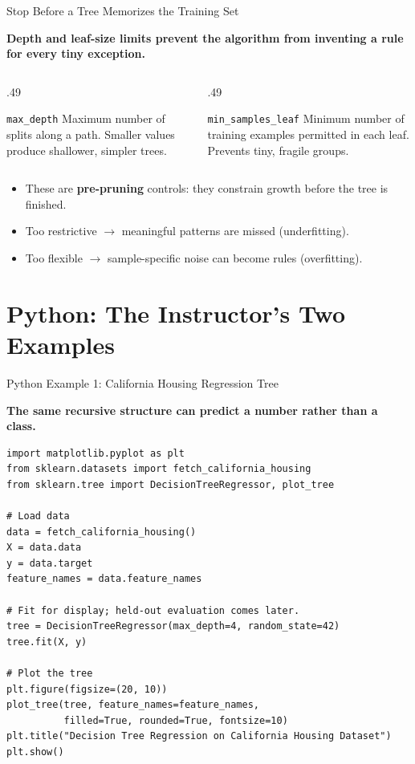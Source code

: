 \documentclass[aspectratio=169,10pt]{beamer}
\newcommand{\conceptlead}[1]{%
  {\normalsize\bfseries\color{CalPolyGreen}#1\par}%
}
\begin{document}
\begin{frame}{Stop Before a Tree Memorizes the Training Set}
\small
\conceptlead{Depth and leaf-size limits prevent the algorithm from inventing a rule for every tiny exception.}
\begin{columns}[T,onlytextwidth]
 \begin{column}{.49\textwidth}
  \begin{block}{\texttt{max\_depth}}
  Maximum number of splits along a path. Smaller values produce shallower, simpler trees.
  \end{block}
 \end{column}
 \begin{column}{.49\textwidth}
  \begin{block}{\texttt{min\_samples\_leaf}}
  Minimum number of training examples permitted in each leaf. Prevents tiny, fragile groups.
  \end{block}
 \end{column}
\end{columns}
\begin{itemize}
 \item These are \textbf{pre-pruning} controls: they constrain growth before the tree is finished.
 \item Too restrictive $\rightarrow$ meaningful patterns are missed (underfitting).
 \item Too flexible $\rightarrow$ sample-specific noise can become rules (overfitting).
\end{itemize}
\end{frame}

\section{Python: The Instructor's Two Examples}

\begin{frame}[fragile]{Python Example 1: California Housing Regression Tree}
\small
\conceptlead{The same recursive structure can predict a number rather than a class.}
{\scriptsize
\begin{verbatim}
import matplotlib.pyplot as plt
from sklearn.datasets import fetch_california_housing
from sklearn.tree import DecisionTreeRegressor, plot_tree

# Load data
data = fetch_california_housing()
X = data.data
y = data.target
feature_names = data.feature_names

# Fit for display; held-out evaluation comes later.
tree = DecisionTreeRegressor(max_depth=4, random_state=42)
tree.fit(X, y)

# Plot the tree
plt.figure(figsize=(20, 10))
plot_tree(tree, feature_names=feature_names,
          filled=True, rounded=True, fontsize=10)
plt.title("Decision Tree Regression on California Housing Dataset")
plt.show()
\end{verbatim}
}
\end{frame}
\end{document}

